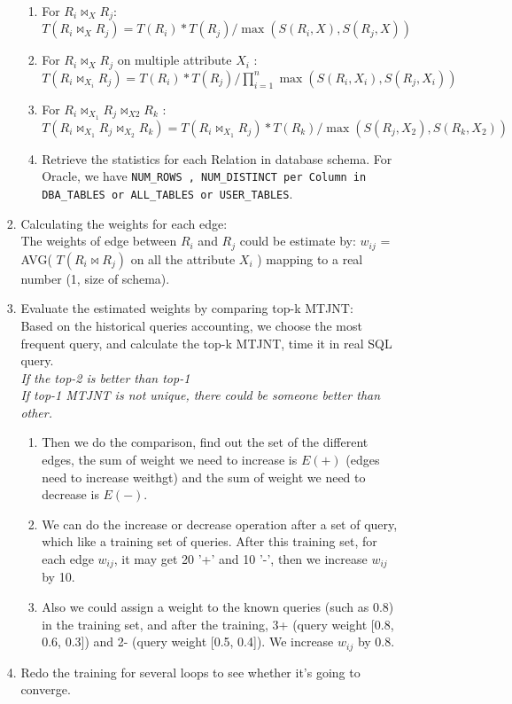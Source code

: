 \begin{enumerate}
\begin{enumerate}
\begin{enumerate}
\begin{enumerate}
    \item For $R_i \Join _X R_j$: \\
    $T(R_i \Join _X R_j)  = T(R_i) * T(R_j) / \max(S(R_i, X), S(R_j, X))$
    \item For $R_i \Join _X R_j$ on multiple attribute $X_i$ : \\
    $T(R_i \Join _{X_i} R_j) = T(R_i) * T(R_j) / \prod_{i=1}^n\max(S(R_i,X_i),S(R_j,X_i))$
    \item For $R_i \Join _{X_1} R_j \Join _{X2} R_k$ :
    $T(R_i \Join _{X_1} R_j \Join _{X_2} R_k) =  T(R_i \Join _{X_1} R_j) * T(R_k) / \max(S(R_j, X_2), S(R_k, X_2))$
  \item Retrieve the statistics for each Relation in database schema. For Oracle, we have \texttt{NUM\string_ROWS , NUM\string_DISTINCT per Column in DBA\string_TABLES or ALL\string_TABLES or USER\string_TABLES}.
    \end{enumerate}
  \item Calculating the weights for each edge:\\
     The weights of edge between $R_i$ and $R_j$ could be estimate by: $w_{ij}$ = AVG( $T(R_i \Join R_j)$ on all the attribute $X_i$ ) mapping to a real number (1, size of schema).
  \item Evaluate the estimated weights by comparing top-k MTJNT:\\
  Based on the historical queries accounting, we choose the most frequent query, and calculate the top-k MTJNT, time it in real SQL query.\\
  {\it If the top-2 is better than top-1}\\
  {\it If top-1 MTJNT is not unique, there could be someone better than other.}\\
    \begin{enumerate}
       \item Then we do the comparison, find out the set of the different edges, the sum of weight we need to increase is $E(+)$ (edges need to increase weithgt) and the sum of weight we need to decrease is $E(-)$.
       \item We can do the increase or decrease operation after a set of query, which like a training set of queries. After this training set, for each edge $w_{ij}$, it may get 20 '+' and 10 '-', then we increase $w_{ij}$ by 10.
       \item Also we could assign a weight to the known queries (such as 0.8) in the training set, and after the training, 3+ (query weight [0.8, 0.6, 0.3]) and 2- (query weight [0.5, 0.4]). We increase $w_{ij}$ by 0.8.
    \end{enumerate}
  \item Redo the training for several loops to see whether it's going to converge.
  \end{enumerate}
\end{enumerate}
\end{enumerate}


